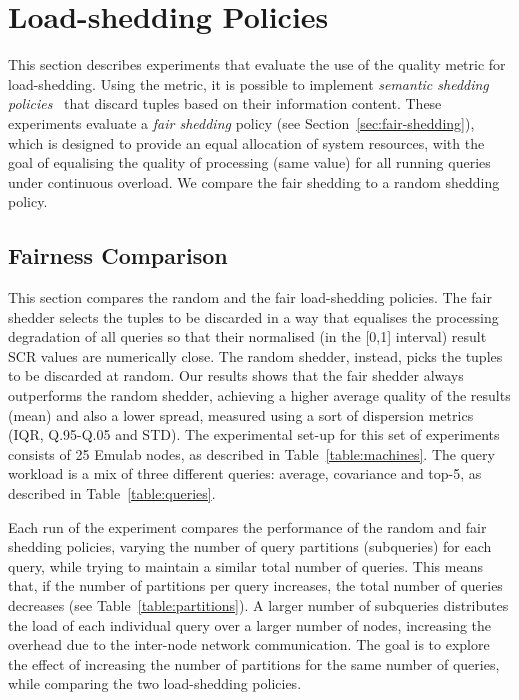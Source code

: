 \section{\mbox{Load-shedding} Policies}
\label{sec:ls-eval}

This section describes experiments that evaluate the use of the \sic quality metric for
\mbox{load-shedding}. Using the \sic metric, it is possible to implement \emph{semantic shedding
policies}~\cite{sem-ls} that discard tuples based on their information content.
These experiments evaluate a \emph{fair shedding} policy (see Section~\ref{sec:fair-shedding}), which is
designed to provide an equal allocation of system resources, with the goal of equalising the
quality of processing (\ie same \sic value) for all running queries under continuous overload.
We compare the fair shedding to a random shedding policy.

\subsection*{Fairness Comparison}
This section compares the random and the fair load-shedding policies. 
The fair shedder selects the tuples to be discarded in a way that equalises the processing
degradation of all queries so that their normalised (\ie in the [0,1] interval) result SCR values are numerically
close.
The random shedder, instead, picks the tuples to be discarded at random.
Our results shows that the fair shedder always outperforms the random shedder,
achieving a higher average quality of the results (mean) and also a lower spread, measured
using a sort of dispersion metrics (IQR, Q.95-Q.05 and STD).
The experimental set-up for this set of experiments consists of 25 Emulab nodes, as described in
Table~\ref{table:machines}.
The query workload is a mix of three different queries: average, covariance and top-5, as described in
Table~\ref{table:queries}. 

Each run of the experiment compares the performance of the random and fair shedding policies, varying the
number of query partitions (\ie subqueries) for each query, while trying to maintain a similar total
number of queries. 
This means that, if the number of partitions per query increases, the total number of queries
decreases (see Table~\ref{table:partitions}). 
A larger number of subqueries distributes the load of each individual query over
a larger number of nodes, increasing the overhead due to the inter-node network communication.
The goal is to explore the effect of increasing the number of partitions for the same number of queries,
while comparing the two load-shedding policies.

